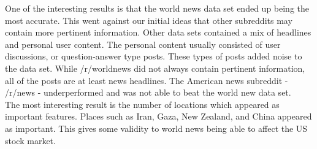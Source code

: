 \documentclass[11pt,a4paper]{article}
\begin{document}
One of the interesting results is that the world news data set ended up being the most accurate. This went against our initial ideas that other subreddits may contain more pertinent information. Other data sets contained a mix of headlines and personal user content. The personal content usually consisted of user discussions, or question-answer type posts. These types of posts added noise to the data set. While /r/worldnews did not always contain pertinent information, all of the posts are at least news headlines. The American news subreddit - /r/news - underperformed and was not able to beat the world new data set.\\

The most interesting result is the number of locations which appeared as important features. Places such as Iran, Gaza, New Zealand, and China appeared as important. This gives some validity to world news being able to affect the US stock market.\\
\end{document}
